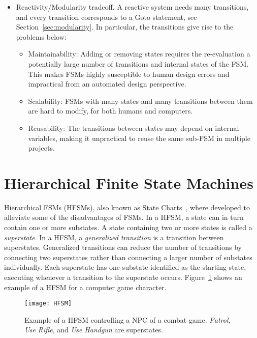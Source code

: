 \begin{itemize}
\item Reactivity/Modularity tradeoff.
A reactive system needs many transitions, and every transition corresponds to a Goto statement, see Section~\ref{sec:modularity}. In particular, the transitions give rise to the problems below:
\begin{itemize}
\item Maintainability: Adding or removing states requires the re-evaluation a potentially large number of transitions and internal states of the FSM. This makes FSMs highly susceptible to human design errors and 
impractical from an automated design perspective.
\item Scalability: FSMs with many states and many transitions between them are hard to modify, for both humans and computers.
\item Reusability: The transitions between states may depend on internal variables, making it unpractical to reuse the same sub-FSM  in multiple projects.
\end{itemize}
\end{itemize}



\section{Hierarchical Finite State Machines}
Hierarchical FSMs (HFSMs)\label{definition:HFSM}, also known as State Charts~\cite{Harel87statecharts}, where developed to alleviate some of the disadvantages of FSMs. In a HFSM, a state can in turn contain one or more substates. A state containing two or more states is called a \emph{superstate}. In a HFSM, a \emph{generalized transition} is a transition between superstates. Generalized transitions can reduce the number of transitions by connecting two superstates rather than connecting a larger number of substates individually. 
Each superstate has one substate identified as the starting state, executing whenever a transition to the superstate occurs.
Figure~\ref{Arch.fig.HFSM} shows an example of a HFSM for a computer game character.


\begin{figure}[h]
\centering
\texttt{[image: HFSM]} 
   \caption{Example of a HFSM controlling a NPC of a combat game. \emph{Patrol}, \emph{Use Rifle}, and \emph{Use Handgun} are superstates.}
    \label{Arch.fig.HFSM}
\end{figure}


